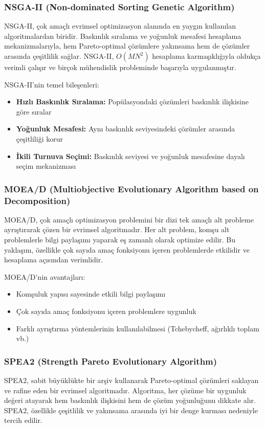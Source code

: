 \subsubsection{NSGA-II (Non-dominated Sorting Genetic Algorithm)}
NSGA-II, çok amaçlı evrimsel optimizasyon alanında en yaygın kullanılan algoritmalardan biridir. Baskınlık sıralama ve yoğunluk mesafesi hesaplama mekanizmalarıyla, hem Pareto-optimal çözümlere yakınsama hem de çözümler arasında çeşitlilik sağlar. NSGA-II, $O(MN^2)$ hesaplama karmaşıklığıyla oldukça verimli çalışır ve birçok mühendislik probleminde başarıyla uygulanmıştır.

NSGA-II'nin temel bileşenleri:
\begin{itemize}
    \item \textbf{Hızlı Baskınlık Sıralama:} Popülasyondaki çözümleri baskınlık ilişkisine göre sıralar
    \item \textbf{Yoğunluk Mesafesi:} Aynı baskınlık seviyesindeki çözümler arasında çeşitliliği korur
    \item \textbf{İkili Turnuva Seçimi:} Baskınlık seviyesi ve yoğunluk mesafesine dayalı seçim mekanizması
\end{itemize}


\subsubsection{MOEA/D (Multiobjective Evolutionary Algorithm based on Decomposition)}
MOEA/D, çok amaçlı optimizasyon problemini bir dizi tek amaçlı alt probleme ayrıştırarak çözen bir evrimsel algoritmadır. Her alt problem, komşu alt problemlerle bilgi paylaşımı yaparak eş zamanlı olarak optimize edilir. Bu yaklaşım, özellikle çok sayıda amaç fonksiyonu içeren problemlerde etkilidir ve hesaplama açısından verimlidir.

MOEA/D'nin avantajları:
\begin{itemize}
    \item Komşuluk yapısı sayesinde etkili bilgi paylaşımı
    \item Çok sayıda amaç fonksiyonu içeren problemlere uygunluk
    \item Farklı ayrıştırma yöntemlerinin kullanılabilmesi (Tchebycheff, ağırlıklı toplam vb.)
\end{itemize}

\subsubsection{SPEA2 (Strength Pareto Evolutionary Algorithm)}
SPEA2, sabit büyüklükte bir arşiv kullanarak Pareto-optimal çözümleri saklayan ve rafine eden bir evrimsel algoritmadır. Algoritma, her çözüme bir uygunluk değeri atayarak hem baskınlık ilişkisini hem de çözüm yoğunluğunu dikkate alır. SPEA2, özellikle çeşitlilik ve yakınsama arasında iyi bir denge kurması nedeniyle tercih edilir.

